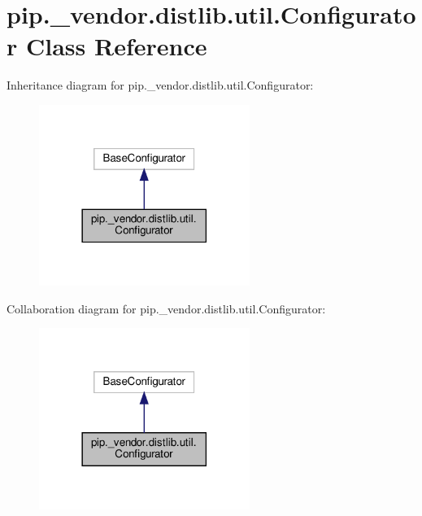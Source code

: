 \hypertarget{classpip_1_1__vendor_1_1distlib_1_1util_1_1Configurator}{}\section{pip.\+\_\+vendor.\+distlib.\+util.\+Configurator Class Reference}
\label{classpip_1_1__vendor_1_1distlib_1_1util_1_1Configurator}


Inheritance diagram for pip.\+\_\+vendor.\+distlib.\+util.\+Configurator\+:
\nopagebreak
\begin{figure}[H]
\begin{center}
\leavevmode
\includegraphics[width=194pt]{classpip_1_1__vendor_1_1distlib_1_1util_1_1Configurator__inherit__graph}
\end{center}
\end{figure}


Collaboration diagram for pip.\+\_\+vendor.\+distlib.\+util.\+Configurator\+:
\nopagebreak
\begin{figure}[H]
\begin{center}
\leavevmode
\includegraphics[width=194pt]{classpip_1_1__vendor_1_1distlib_1_1util_1_1Configurator__coll__graph}
\end{center}
\end{figure}
